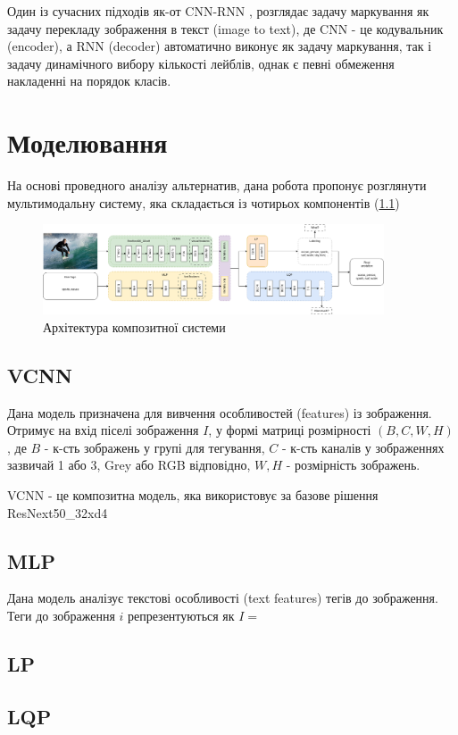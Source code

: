 \documentclass{udstu}
\begin{document}
Один із сучасних підходів як-от CNN-RNN \cite{cnn-rnn},
розглядає задачу маркування як задачу перекладу зображення в текст (image to text),
де CNN - це кодувальник (encoder), а RNN (decoder) автоматично виконує як задачу маркування,
так і задачу динамічного вибору кількості лейблів, однак є певні обмеження
накладенні на порядок класів.


\chapter{Моделювання}

На основі проведного аналізу альтернатив, дана робота пропонує розглянути
мультимодальну систему, яка складається із чотирьох компонентів (\figurename{\ref{figure:composite}})

\begin{figure}[!ht]
	\centering
	\includegraphics[width=0.9\textwidth]{PNG/composite}
	\caption{Архітектура композитної системи}
	\label{figure:composite}
\end{figure}

\section{VCNN}

Дана модель призначена для вивчення особливостей (features) із зображення.
Отримує на вхід піселі зображення $I$, у формі матриці розмірності $(B,C,W,H)$, де
$B$ - к-сть зображень у групі для тегування,
$C$ - к-сть каналів у зображеннях зазвичай 1 або 3, Grey або RGB відповідно,
$W,H$ - розмірність зображень.

VCNN - це композитна модель, яка використовує за базове рішення ResNext50\_32xd4


\section{MLP}

Дана модель аналізує текстові особливості (text features) тегів до зображення.
Теги до зображення $i$ репрезентуються як $I = $

\section{LP}


\section{LQP}



\conclusions

\printbibliography
\end{document}
